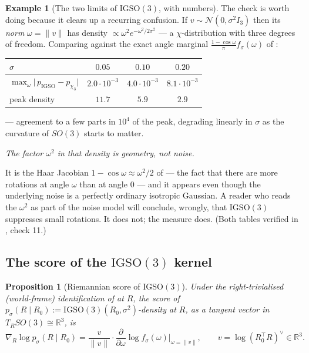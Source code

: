 \documentclass[11pt,a4paper]{report}
\newtheorem{proposition}[proposition]{Proposition}
\theoremstyle{definition}
\newtheorem{example}[example]{Example}
\theoremstyle{remark}
\newcommand{\RR}{\mathbb R}
\begin{document}
\begin{example}[The two limits of $\mathrm{IGSO}(3)$, with numbers]
The check is worth doing because it clears up a recurring confusion. If
$v\sim\mathcal N(0,\sigma^2I_3)$ then its \emph{norm} $\omega=\|v\|$ has
density $\propto\omega^2e^{-\omega^2/2\sigma^2}$ --- a $\chi$-distribution
with three degrees of freedom. Comparing against the exact angle marginal
$\tfrac{1-\cos\omega}{\pi}f_\sigma(\omega)$ of
:

\begin{center}
\begin{tabular}{lccc}
\toprule
$\sigma$ & $0.05$ & $0.10$ & $0.20$ \\
\midrule
$\max_\omega\bigl|\,p_{\mathrm{IGSO}}-p_{\chi_3}\bigr|$ & $2.0\cdot10^{-3}$ & $4.0\cdot10^{-3}$ & $8.1\cdot10^{-3}$ \\
peak density & $11.7$ & $5.9$ & $2.9$ \\
\bottomrule
\end{tabular}
\end{center}

--- agreement to a few parts in $10^{4}$ of the peak, degrading linearly in
$\sigma$ as the curvature of $SO(3)$ starts to matter.

\begin{center}
\emph{The factor $\omega^2$ in that density is geometry, not noise.}
\end{center}

It is the Haar Jacobian $1-\cos\omega\approx\omega^2/2$ of
 --- the fact that there are more rotations at angle
$\omega$ than at angle $0$ --- and it appears even though the underlying
noise is a perfectly ordinary isotropic Gaussian. A reader who reads the
$\omega^2$ as part of the noise model will conclude, wrongly, that
$\mathrm{IGSO}(3)$ suppresses small rotations. It does not; the measure
does. (Both tables verified in , check 11.)
\end{example}

\subsection{The score of the $\mathrm{IGSO}(3)$ kernel}
\label{sec:igso3-score-derivation}

\begin{proposition}[Riemannian score of $\mathrm{IGSO}(3)$]
\label{prop:igso3-score-scratch}
Under the right-trivialised (world-frame) identification of
 at $R$, the score of
$p_{\sigma}(R\mid R_0):=\mathrm{IGSO}(3)(R_0,\sigma^2)$-density at $R$, as a
tangent vector in $T_RSO(3)\cong\RR^3$, is
\begin{equation}
\label{eq:igso3-score-scratch}
\nabla_R\log p_\sigma(R\mid R_0)
=
\frac{v}{\|v\|}\cdot\frac{\partial}{\partial\omega}\log f_\sigma(\omega)\Big|_{\omega=\|v\|},
\qquad
v = \log(R_0^\top R)^\vee \in\RR^3 .
\end{equation}
\end{proposition}
\end{document}
